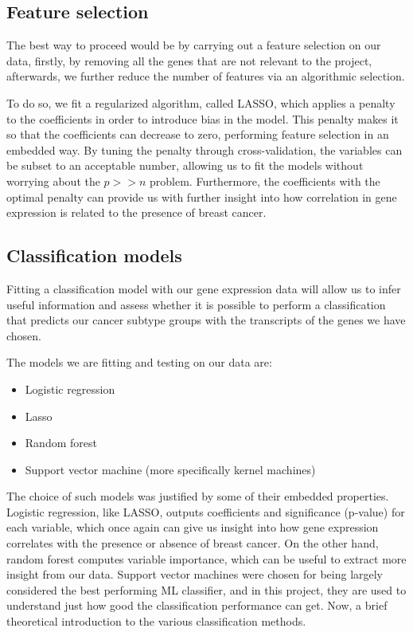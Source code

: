 \documentclass[journal]{IEEEtran}
\begin{document}
\subsection{Feature selection}
The best way to proceed would be by carrying out a feature selection on our data, firstly, by removing all the genes that are not relevant to the project, afterwards, we further reduce the number of features via an algorithmic selection.

To do so, we fit a regularized algorithm, called LASSO, which applies a penalty to the coefficients in order to introduce bias in the model. This penalty makes it so that the coefficients can decrease to zero, performing feature selection in an embedded way. By tuning the penalty through cross-validation, the variables can be subset to an acceptable number, allowing us to fit the models without worrying about the $p>>n$ problem. Furthermore, the coefficients with the optimal penalty can provide us with further insight into how correlation in gene expression is related to the presence of breast cancer.

\subsection{Classification models}
Fitting a classification model with our gene expression data will allow us to infer useful information and assess whether it is possible to perform a classification that predicts our cancer subtype groups with the transcripts of the genes we have chosen.

The models we are fitting and testing on our data are:
\begin{itemize}
    \item Logistic regression
    \item Lasso
    \item Random forest
    \item Support vector machine (more specifically kernel machines)
\end{itemize}

The choice of such models was justified by some of their embedded properties. Logistic regression, like LASSO, outputs coefficients and significance (p-value) for each variable, which once again can give us insight into how gene expression correlates with the presence or absence of breast cancer.
On the other hand, random forest computes variable importance, which can be useful to extract more insight from our data.
Support vector machines were chosen for being largely considered the best performing ML classifier, and in this project, they are used to understand just how good the classification performance can get.\newline
Now, a brief theoretical introduction to the various classification methods.
\end{document}
